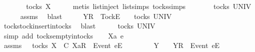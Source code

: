 \begin{isabellebody}
\ \ \isamarkupfalse%
\ \isamarkupfalse%
\ {\isachardoublequoteopen}{\isasymrho}\ {\isasymin}\ tocks\ X{\isachardoublequoteclose}\isanewline
\ \ \ \ \isamarkupfalse%
\ {\isacharparenleft}metis\ list{\isachardot}inject\ list{\isachardot}simps{\isacharparenleft}{}{\isacharparenright}\ tocks{\isachardot}simps{\isacharparenright}\isanewline
\ \ \isamarkupfalse%
\ \isamarkupfalse%
\ {\isachardoublequoteopen}{\isasymsigma}\ {\isasymin}\ tocks\ UNIV{\isachardoublequoteclose}\isanewline
\ \ \ \ \isamarkupfalse%
\ assms{\isacharparenleft}{}{\isacharparenright}\ \isamarkupfalse%
\ blast\isanewline
\ \ \isamarkupfalse%
\ \isamarkupfalse%
\ {\isachardoublequoteopen}{\isacharbrackleft}Y{\isacharbrackright}\isactrlsub R\ {\isacharhash}\ {\isacharbrackleft}Tock{\isacharbrackright}\isactrlsub E\ {\isacharhash}\ {\isasymsigma}\ {\isasymin}\ tocks\ UNIV{\isachardoublequoteclose}\isanewline
\ \ \ \ \isamarkupfalse%
\ tocks{\isachardot}tock{\isacharunderscore}insert{\isacharunderscore}in{\isacharunderscore}tocks\ \isamarkupfalse%
\ blast\isanewline
{}\isamarkupfalse%
\isanewline
\ \ \isamarkupfalse%
\ {\isachardoublequoteopen}{\isacharbrackleft}{\isacharbrackright}\ {\isasymin}\ tocks\ UNIV{\isachardoublequoteclose}\isanewline
\ \ \ \ \isamarkupfalse%
\ {\isacharparenleft}simp\ add{\isacharcolon}\ tocks{\isachardot}empty{\isacharunderscore}in{\isacharunderscore}tocks{\isacharparenright}\isanewline
{}\isamarkupfalse%
\isanewline
\ \ \isamarkupfalse%
\ Xa\ e\ {\isasymrho}\ {\isasymsigma}\isanewline
\ \ \isamarkupfalse%
\ assms{\isacharcolon}\ {\isachardoublequoteopen}{\isasymrho}\ {\isasymin}\ tocks\ X{\isachardoublequoteclose}\ {\isachardoublequoteopen}{\isasymrho}\ {\isasymsubseteq}\isactrlsub C\ {\isacharbrackleft}Xa{\isacharbrackright}\isactrlsub R\ {\isacharhash}\ {\isacharbrackleft}Event\ e{\isacharbrackright}\isactrlsub E\ {\isacharhash}\ {\isasymsigma}{\isachardoublequoteclose}\isanewline
\ \ \isamarkupfalse%
\ \isamarkupfalse%
\ {\isasymrho}{\isacharprime}\ Y\ \ {\isachardoublequoteopen}{\isasymrho}\ {\isacharequal}\ {\isacharbrackleft}Y{\isacharbrackright}\isactrlsub R\ {\isacharhash}\ {\isacharbrackleft}Event\ e{\isacharbrackright}\isactrlsub E\ {\isacharhash}\ {\isasymrho}{\isacharprime}{\isachardoublequoteclose}\isanewline

\end{isabellebody}

